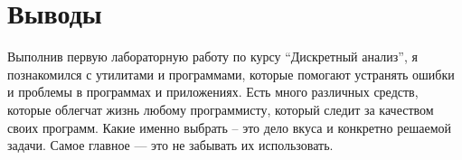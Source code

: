 \section{Выводы}
Выполнив первую лабораторную работу по курсу \enquote{Дискретный анализ}, я познакомился с утилитами и программами, которые помогают устранять ошибки и проблемы в программах и приложениях. Есть много различных средств, которые облегчат жизнь любому программисту, который следит за качеством своих программ. Какие именно выбрать -- это дело вкуса и конкретно решаемой задачи. Самое главное --- это не забывать их использовать.
\pagebreak